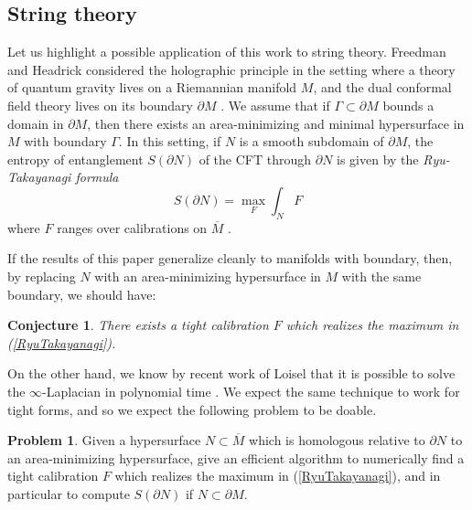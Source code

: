 \documentclass[reqno,11pt]{amsart}
\newcommand{\dfn}[1]{\emph{#1}\index{#1}}
\newtheorem{conjecture}[theorem]{Conjecture}
\theoremstyle{definition}
\newtheorem{problem}[theorem]{Problem}
\numberwithin{equation}{section}
\begin{document}
\subsection{String theory}
Let us highlight a possible application of this work to string theory.
Freedman and Headrick considered the holographic principle in the setting where a theory of quantum gravity lives on a Riemannian manifold $M$, and the dual conformal field theory lives on its boundary $\partial M$ \cite{Freedman_2016}.
We assume that if $\Gamma \subset \partial M$ bounds a domain in $\partial M$, then there exists an area-minimizing and minimal hypersurface in $M$ with boundary $\Gamma$.
In this setting, if $N$ is a smooth subdomain of $\partial M$, the entropy of entanglement $S(\partial N)$ of the CFT through $\partial N$ is given by the \dfn{Ryu-Takayanagi formula}
\begin{equation}\label{RyuTakayanagi}
S(\partial N) = \max_F \int_N F
\end{equation}
where $F$ ranges over calibrations on $\overline M$ \cite[(2.8)]{Freedman_2016}.

If the results of this paper generalize cleanly to manifolds with boundary, then, by replacing $N$ with an area-minimizing hypersurface in $M$ with the same boundary, we should have:

\begin{conjecture}
There exists a tight calibration $F$ which realizes the maximum in (\ref{RyuTakayanagi}).
\end{conjecture}

On the other hand, we know by recent work of Loisel that it is possible to solve the $\infty$-Laplacian in polynomial time \cite{Loisel_2020}.
We expect the same technique to work for tight forms, and so we expect the following problem to be doable.

\begin{problem}
Given a hypersurface $N \subset \overline M$ which is homologous relative to $\partial N$ to an area-minimizing hypersurface, give an efficient algorithm to numerically find a tight calibration $F$ which realizes the maximum in (\ref{RyuTakayanagi}), and in particular to compute $S(\partial N)$ if $N \subset \partial M$.
\end{problem}

\end{document}
